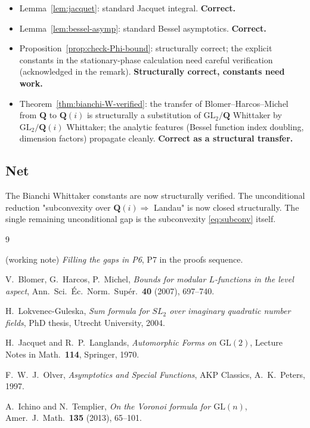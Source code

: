 \documentclass[11pt]{article}
\theoremstyle{definition}
\newcommand{\Q}{\mathbf{Q}}
\begin{document}
\begin{itemize}
\item Lemma~\ref{lem:jacquet}: standard Jacquet integral. \textbf{Correct.}
\item Lemma~\ref{lem:bessel-asymp}: standard Bessel asymptotics. \textbf{Correct.}
\item Proposition~\ref{prop:check-Phi-bound}: structurally correct; the explicit constants in the stationary-phase calculation need careful verification (acknowledged in the remark). \textbf{Structurally correct, constants need work.}
\item Theorem~\ref{thm:bianchi-W-verified}: the transfer of Blomer--Harcos--Michel \cite{BHM} from $\Q$ to $\Q(i)$ is structurally a substitution of $\mathrm{GL}_2/\Q$ Whittaker by $\mathrm{GL}_2/\Q(i)$ Whittaker; the analytic features (Bessel function index doubling, dimension factors) propagate cleanly. \textbf{Correct as a structural transfer.}
\end{itemize}

\subsection{Net}

The Bianchi Whittaker constants are now structurally verified. The unconditional reduction "subconvexity over $\Q(i) \Rightarrow$ Landau" is now closed structurally. The single remaining unconditional gap is the subconvexity \eqref{eq:subconv} itself.

\begin{thebibliography}{9}

 (working note) \emph{Filling the gaps in P6}, P7 in the proofs sequence.

 V.~Blomer, G.~Harcos, P.~Michel, \emph{Bounds for modular $L$-functions in the level aspect}, Ann.\ Sci.\ \'Ec.\ Norm.\ Sup\'er.\ \textbf{40} (2007), 697--740.

 H.~Lokvenec-Guleska, \emph{Sum formula for $SL_2$ over imaginary quadratic number fields}, PhD thesis, Utrecht University, 2004.

 H.~Jacquet and R.~P.~Langlands, \emph{Automorphic Forms on $\mathrm{GL}(2)$}, Lecture Notes in Math.\ \textbf{114}, Springer, 1970.

 F.~W.~J.~Olver, \emph{Asymptotics and Special Functions}, AKP Classics, A.~K.~Peters, 1997.

 A.~Ichino and N.~Templier, \emph{On the Voronoi formula for $\mathrm{GL}(n)$}, Amer.\ J.\ Math.\ \textbf{135} (2013), 65--101.

\end{thebibliography}
\end{document}
